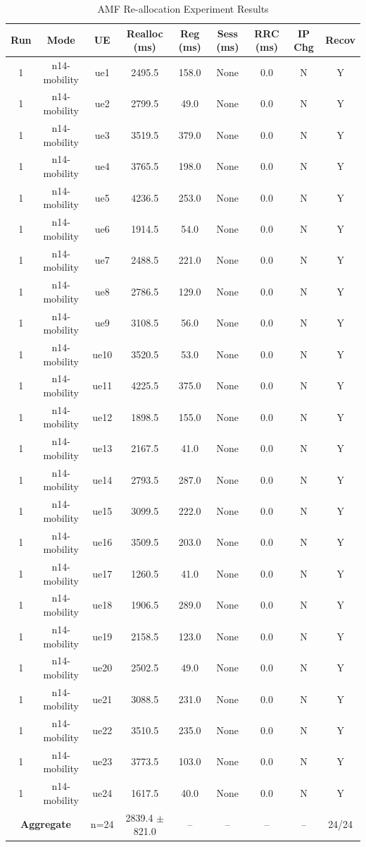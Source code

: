 \begin{table}[ht]
\centering
\begin{tabular}{|c|c|c|c|c|c|c|c|c|}
\hline
Run & Mode & UE & Realloc (ms) & Reg (ms) & Sess (ms) & RRC (ms) & IP Chg & Recov \\
\hline
1 & n14-mobility & ue1 & 2495.5 & 158.0 & None & 0.0 & N & Y \\
1 & n14-mobility & ue2 & 2799.5 & 49.0 & None & 0.0 & N & Y \\
1 & n14-mobility & ue3 & 3519.5 & 379.0 & None & 0.0 & N & Y \\
1 & n14-mobility & ue4 & 3765.5 & 198.0 & None & 0.0 & N & Y \\
1 & n14-mobility & ue5 & 4236.5 & 253.0 & None & 0.0 & N & Y \\
1 & n14-mobility & ue6 & 1914.5 & 54.0 & None & 0.0 & N & Y \\
1 & n14-mobility & ue7 & 2488.5 & 221.0 & None & 0.0 & N & Y \\
1 & n14-mobility & ue8 & 2786.5 & 129.0 & None & 0.0 & N & Y \\
1 & n14-mobility & ue9 & 3108.5 & 56.0 & None & 0.0 & N & Y \\
1 & n14-mobility & ue10 & 3520.5 & 53.0 & None & 0.0 & N & Y \\
1 & n14-mobility & ue11 & 4225.5 & 375.0 & None & 0.0 & N & Y \\
1 & n14-mobility & ue12 & 1898.5 & 155.0 & None & 0.0 & N & Y \\
1 & n14-mobility & ue13 & 2167.5 & 41.0 & None & 0.0 & N & Y \\
1 & n14-mobility & ue14 & 2793.5 & 287.0 & None & 0.0 & N & Y \\
1 & n14-mobility & ue15 & 3099.5 & 222.0 & None & 0.0 & N & Y \\
1 & n14-mobility & ue16 & 3509.5 & 203.0 & None & 0.0 & N & Y \\
1 & n14-mobility & ue17 & 1260.5 & 41.0 & None & 0.0 & N & Y \\
1 & n14-mobility & ue18 & 1906.5 & 289.0 & None & 0.0 & N & Y \\
1 & n14-mobility & ue19 & 2158.5 & 123.0 & None & 0.0 & N & Y \\
1 & n14-mobility & ue20 & 2502.5 & 49.0 & None & 0.0 & N & Y \\
1 & n14-mobility & ue21 & 3088.5 & 231.0 & None & 0.0 & N & Y \\
1 & n14-mobility & ue22 & 3510.5 & 235.0 & None & 0.0 & N & Y \\
1 & n14-mobility & ue23 & 3773.5 & 103.0 & None & 0.0 & N & Y \\
1 & n14-mobility & ue24 & 1617.5 & 40.0 & None & 0.0 & N & Y \\
\multicolumn{2}{|c|}{\textbf{Aggregate}} & n=24 & 2839.4 $\pm$ 821.0 & -- & -- & -- & -- & 24/24 \\
\hline
\end{tabular}
\caption{AMF Re-allocation Experiment Results}
\label{tab:amf_realloc}
\end{table}
